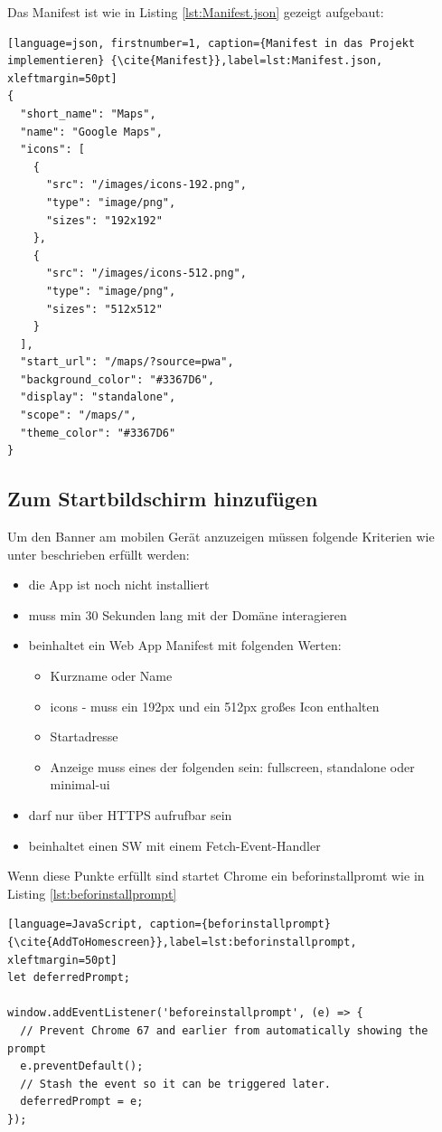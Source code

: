 \newpage
Das Manifest ist wie in Listing \ref{lst:Manifest.json} gezeigt aufgebaut:
\begin{lstlisting}[language=json, firstnumber=1, caption={Manifest in das Projekt implementieren} {\cite{Manifest}},label=lst:Manifest.json, xleftmargin=50pt]
{
  "short_name": "Maps",
  "name": "Google Maps",
  "icons": [
    {
      "src": "/images/icons-192.png",
      "type": "image/png",
      "sizes": "192x192"
    },
    {
      "src": "/images/icons-512.png",
      "type": "image/png",
      "sizes": "512x512"
    }
  ],
  "start_url": "/maps/?source=pwa",
  "background_color": "#3367D6",
  "display": "standalone",
  "scope": "/maps/",
  "theme_color": "#3367D6"
}
\end{lstlisting}

\subsection{Zum Startbildschirm hinzufügen}
Um den Banner am mobilen Gerät anzuzeigen müssen folgende Kriterien wie unter \cite{AddToHomescreen} beschrieben erfüllt werden:


\begin{itemize}
    \item  die App ist noch nicht installiert
	\item  muss min 30 Sekunden lang mit der Domäne interagieren
	\item  beinhaltet ein Web App Manifest mit folgenden Werten:
		 \begin{itemize}
         \item Kurzname oder Name
         \item icons - muss ein 192px und ein 512px großes Icon enthalten
         \item Startadresse
         \item Anzeige muss eines der folgenden sein: fullscreen, standalone oder \\ minimal-ui
      	\end{itemize}
    \item 	darf nur über HTTPS aufrufbar sein
    \item beinhaltet einen \acl{SW} mit einem Fetch-Event-Handler
\end{itemize}

\newpage
Wenn diese Punkte erfüllt sind startet Chrome ein beforinstallpromt wie in Listing \ref{lst:beforinstallprompt}


\begin{lstlisting}[language=JavaScript, caption={beforinstallprompt} {\cite{AddToHomescreen}},label=lst:beforinstallprompt, xleftmargin=50pt]
let deferredPrompt;

window.addEventListener('beforeinstallprompt', (e) => {
  // Prevent Chrome 67 and earlier from automatically showing the prompt
  e.preventDefault();
  // Stash the event so it can be triggered later.
  deferredPrompt = e;
});
\end{lstlisting}

